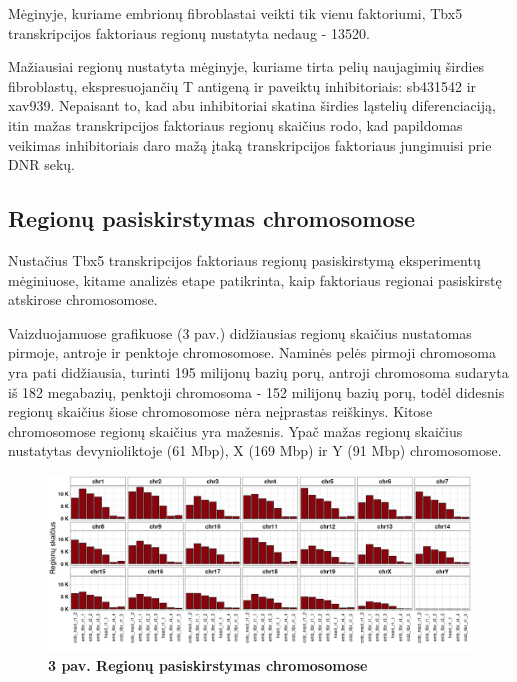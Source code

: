 \documentclass[12pt]{article}
\begin{document}
Mėginyje, kuriame embrionų fibroblastai veikti tik vienu faktoriumi, Tbx5
transkripcijos faktoriaus regionų nustatyta nedaug - 13520.

Mažiausiai regionų nustatyta mėginyje, kuriame tirta pelių naujagimių širdies
fibroblastų, ekspresuojančių T antigeną ir paveiktų inhibitoriais: sb431542 ir
xav939. Nepaisant to, kad abu inhibitoriai skatina širdies ląstelių
diferenciaciją\cite{HEART_CELL_DIFF_ARTCL}, itin mažas transkripcijos
faktoriaus regionų skaičius rodo, kad papildomas veikimas inhibitoriais daro
mažą įtaką transkripcijos faktoriaus jungimuisi prie DNR sekų.

\newpage


\subsection{Regionų pasiskirstymas chromosomose}
Nustačius Tbx5 transkripcijos faktoriaus regionų pasiskirstymą eksperimentų
mėginiuose, kitame analizės etape patikrinta, kaip faktoriaus regionai
pasiskirstę atskirose chromosomose.

Vaizduojamuose grafikuose (3 pav.) didžiausias regionų skaičius nustatomas
pirmoje, antroje ir penktoje chromosomose. Naminės pelės pirmoji chromosoma yra
pati didžiausia, turinti 195 milijonų bazių porų, antroji chromosoma sudaryta
iš 182 megabazių, penktoji chromosoma - 152 milijonų bazių porų, todėl didesnis
regionų skaičius šiose chromosomose nėra neįprastas reiškinys. Kitose
chromosomose regionų skaičius yra mažesnis. Ypač mažas regionų skaičius
nustatytas devynioliktoje (61 Mbp), X (169 Mbp) ir Y (91 Mbp) chromosomose.

\begin{figure}[htb]
    \begin{center}
        \includegraphics[width=0.8\linewidth]{../Figures/peak_counts_by_chr.png}
        \caption*{\small\textbf{3 pav. Regionų pasiskirstymas chromosomose}}
    \end{center}
\end{figure}
\end{document}
